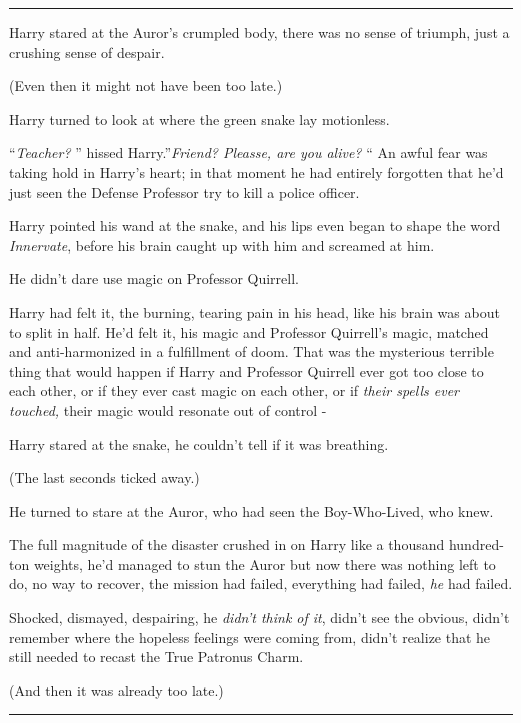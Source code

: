 \begin{center}\rule{3in}{0.4pt}\end{center}

Harry stared at the Auror's crumpled body, there was no sense of
triumph, just a crushing sense of despair.

(Even then it might not have been too late.)

Harry turned to look at where the green snake lay motionless.

``\emph{Teacher?} '' hissed Harry.''\emph{Friend? Pleasse, are you alive?}
`` An awful fear was taking hold in Harry's heart; in that moment he had
entirely forgotten that he'd just seen the Defense Professor try to kill
a police officer.

Harry pointed his wand at the snake, and his lips even began to shape
the word \emph{Innervate}, before his brain caught up with him and
screamed at him.

He didn't dare use magic on Professor Quirrell.

Harry had felt it, the burning, tearing pain in his head, like his brain
was about to split in half. He'd felt it, his magic and Professor
Quirrell's magic, matched and anti-harmonized in a fulfillment of doom.
That was the mysterious terrible thing that would happen if Harry and
Professor Quirrell ever got too close to each other, or if they ever
cast magic on each other, or if \emph{their spells ever touched,} their
magic would resonate out of control -

Harry stared at the snake, he couldn't tell if it was breathing.

(The last seconds ticked away.)

He turned to stare at the Auror, who had seen the Boy-Who-Lived, who
knew.

The full magnitude of the disaster crushed in on Harry like a thousand
hundred-ton weights, he'd managed to stun the Auror but now there was
nothing left to do, no way to recover, the mission had failed,
everything had failed, \emph{he} had failed.

Shocked, dismayed, despairing, he \emph{didn't think of it}, didn't see
the obvious, didn't remember where the hopeless feelings were coming
from, didn't realize that he still needed to recast the True Patronus
Charm.

(And then it was already too late.)

\begin{center}\rule{3in}{0.4pt}\end{center}

